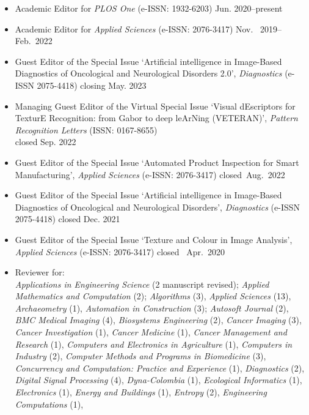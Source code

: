 \documentclass[11pt]{article}
\begin{document}
\begin{itemize}
	\item Academic Editor for \emph{PLOS One} (e-ISSN: 1932-6203) \hfill Jun. 2020--present
	\item Academic Editor for \emph{Applied Sciences} (e-ISSN: 2076-3417) \hfill Nov.~ 2019--Feb.~2022
	\item Guest Editor of the Special Issue `Artificial intelligence in Image-Based Diagnostics of Oncological and Neurological Disorders 2.0', \emph{Diagnostics} (e-ISSN 2075-4418) \hfill closing May. 2023
		\item Managing Guest Editor of the Virtual Special Issue `Visual dEscriptors for TexturE Recognition: from Gabor to deep leArNing (VETERAN)', \emph{Pattern Recognition Letters} (ISSN: 0167-8655) \\ \mbox{} \hfill closed Sep. 2022
	\item Guest Editor of the Special Issue `Automated Product Inspection for Smart Manufacturing', \emph{Applied Sciences} (e-ISSN: 2076-3417) \hfill closed~Aug.~2022
	\item Guest Editor of the Special Issue `Artificial intelligence in Image-Based Diagnostics of Oncological and Neurological Disorders', \emph{Diagnostics} (e-ISSN 2075-4418) \hfill closed Dec. 2021
	\item Guest Editor of the Special Issue `Texture and Colour in Image Analysis', \emph{Applied Sciences} (e-ISSN: 2076-3417) \hfill closed~ Apr.~2020
	\item Reviewer for: \\
		\emph{Applications in Engineering Science} (2 manuscript revised);
    \emph{Applied Mathematics and Computation} (2);
    \emph{Algorithms} (3),
    \emph{Applied Sciences} (13),
    \emph{Archaeometry} (1),
    \emph{Automation in Construction} (3);
    \emph{Autosoft Journal} (2),
    \emph{BMC Medical Imaging} (4),
    \emph{Biosystems Engineering} (2),
    \emph{Cancer Imaging} (3),
    \emph{Cancer Investigation} (1),
    \emph{Cancer Medicine} (1),
    \emph{Cancer Management and Research} (1),
    \emph{Computers and Electronics in Agriculture} (1),
    \emph{Computers in Industry} (2),
    \emph{Computer Methods and Programs in Biomedicine} (3),
    \emph{Concurrency and Computation: Practice and Experience} (1), 
    \emph{Diagnostics} (2),
    \emph{Digital Signal Processing} (4),
    \emph{Dyna-Colombia} (1),
    \emph{Ecological Informatics} (1),
    \emph{Electronics} (1),
    \emph{Energy and Buildings} (1),
    \emph{Entropy} (2),
    \emph{Engineering Computations} (1),

\end{itemize}
\end{document}
